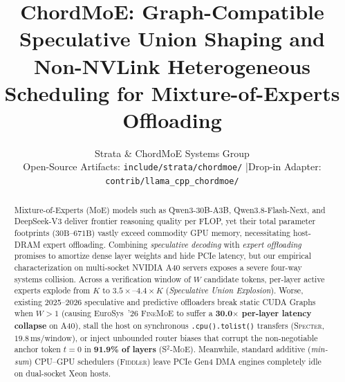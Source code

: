 \documentclass[10pt,twocolumn]{article}
\title{\Large\bfseries ChordMoE: Graph-Compatible Speculative Union Shaping and Non-NVLink Heterogeneous Scheduling for Mixture-of-Experts Offloading}
\author{
  \normalsize Strata \& ChordMoE Systems Group\\
  \small Open-Source Artifacts: \texttt{include/strata/chordmoe/} \quad|\quad Drop-in Adapter: \texttt{contrib/llama\_cpp\_chordmoe/}
}
\date{}
\theoremstyle{definition}
\begin{document}
\maketitle

\begin{abstract}
Mixture-of-Experts (MoE) models such as Qwen3-30B-A3B, Qwen3.8-Flash-Next, and DeepSeek-V3 deliver frontier reasoning quality per FLOP, yet their total parameter footprints ($30\text{B}\text{--}671\text{B}$) vastly exceed commodity GPU memory, necessitating host-DRAM expert offloading. Combining \emph{speculative decoding} with \emph{expert offloading} promises to amortize dense layer weights and hide PCIe latency, but our empirical characterization on multi-socket NVIDIA A40 servers exposes a severe four-way systems collision. Across a verification window of $W$ candidate tokens, per-layer active experts explode from $K$ to $3.5\times\text{--}4.4\times K$ (\emph{Speculative Union Explosion}). Worse, existing 2025--2026 speculative and predictive offloaders break static CUDA Graphs when $W > 1$ (causing EuroSys~'26 \textsc{FineMoE} to suffer a \textbf{30.0$\times$ per-layer latency collapse} on A40), stall the host on synchronous \texttt{.cpu().tolist()} transfers (\textsc{Specter}, $19.8\,\text{ms/window}$), or inject unbounded router biases that corrupt the non-negotiable anchor token $t=0$ in \textbf{91.9\% of layers} (\textsc{S$^2$-MoE}). Meanwhile, standard additive (\emph{min-sum}) CPU--GPU schedulers (\textsc{Fiddler}) leave PCIe Gen4 DMA engines completely idle on dual-socket Xeon hosts.


\end{abstract}
\end{document}
